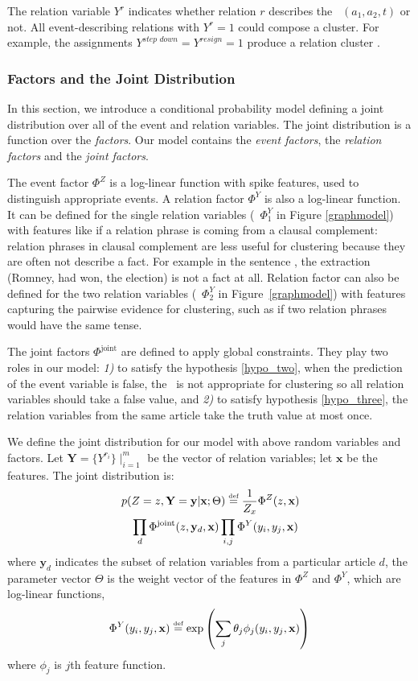 The relation variable $Y^r$ indicates whether relation $r$ describes the \eec\ $(a_1,a_2,t)$ or not. All event-describing relations with $Y^r=1$ could compose a cluster. For example, the assignments $Y^{\textit{step\ down}}=Y^{\textit{resign}}=1$ produce a relation cluster .

\subsubsection{Factors and the Joint Distribution}
In this section, we introduce a conditional probability model defining a joint distribution over all of the event and relation variables. The joint distribution is a function over the {\it factors}. Our model contains the {\em event factors}, the {\em relation factors} and the {\em joint factors}.

The event factor $\Phi^Z$ is a log-linear function with spike features, used to distinguish appropriate events. A relation factor $\Phi^Y$ is also a log-linear function. It can be defined for the single relation variables (\eg\ $\Phi^Y_1$ in Figure \ref{graphmodel}) with features like if a relation phrase is coming from a clausal complement: relation phrases in clausal complement are less useful for clustering because they are often not describe a fact. For example in the sentence , the extraction (Romney, had won, the election) is not a fact at all. Relation factor can also be defined for the two relation variables (\eg\ $\Phi^Y_2$ in Figure~\ref{graphmodel}) with features capturing the pairwise evidence for clustering, such as if two relation phrases would have the same tense.

The joint factors $\Phi^{\text{joint}}$ are defined to apply global constraints. They play two roles in our model: \textit{1)} to satisfy the hypothesis \ref{hypo_two}, when the prediction of the event variable is false, the \eec\ is not appropriate for clustering so all relation variables should take a false value, and \textit{2)} to satisfy hypothesis \ref{hypo_three}, the relation variables from the same article take the truth value at most once.

We define the joint distribution for our model with above random variables and factors. Let $\mathbf{Y}=\{Y^{r_i}\}\mid_{i=1}^m$ be the vector of relation variables; let $\mathbf{x}$ be the features. The joint distribution is:
\begin{eqnarray*}
\lefteqn{p(Z = z, \mathbf{Y} = \mathbf{y}|\mathbf{x}; \Theta) \stackrel{\text{\tiny def}}{=} \frac{1}{Z_{x}}\Phi^{Z}(z,\mathbf{x}) }\\
    && \prod_d \Phi^{\text{joint}}(z,\mathbf{y}_d,\mathbf{x})
        \prod_{i,j} \Phi^Y (y_i,y_j,\mathbf{x})
\end{eqnarray*}
\noindent
where $\mathbf{y}_d$ indicates the subset of relation variables from a particular article $d$, the parameter vector $\Theta$ is the weight vector of the features in $\Phi^Z$ and $\Phi^Y$, which are log-linear functions, \eg
\[
\Phi^{Y}(y_i,y_j,\mathbf{x}) \stackrel{\text{\tiny def}}{=}
\exp \left( \sum_j \theta_{j} \phi_j(y_i,y_j,\mathbf{x}) \right)
\]
where $\phi_j$ is $j$th feature function.

